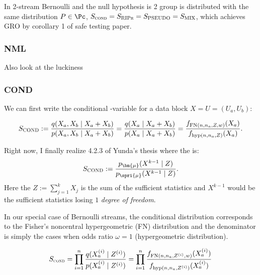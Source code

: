 \begin{remark}
	In 2-stream Bernoulli and the null hypothesis is 2 group is distributed with the same distribution $P \in \Pc$,
	$S_{\textsc{cond}} = S_{\textsc{RIPr}} = S_{\textsc{PSEUDO}} = S_{\textsc{MIX}}$,
	which achieves GRO by corollary 1 of safe testing paper.
\end{remark}

\subsubsection{NML}

Also look at the luckiness

\subsubsection{COND}


We can first write the conditional \E-variable for a data block $X = U = (U_a, U_b)$:

\begin{align*}
	S_{\textsc{COND}} := \frac{q(X_a, X_b \mid X_a + X_b)}{p(X_a, X_b \mid X_a + X_b)}
	= \frac{q(X_a\mid X_a +X_b)}{p(X_a\mid X_a+X_b)}
	= \frac{f_{\textrm{FN}(n,n_a,Z,w)}(X_a)}{f_{\textrm{hyp}(n,n_a,Z)}(X_a)}.
\end{align*}

\begin{remark}
	Right now, I finally realize 4.2.3 of Yunda's thesis where the \E is:
	\begin{align*}
		S_{\textsc{COND}} := \frac{p_{\bm{\mu}}(X^{k-1}\mid Z)}{p_{\spri{\mu}}(X^{k-1}\mid Z)}.
	\end{align*}
	Here the $Z:=\sum_{j=1}^k X_j$ is the sum of the sufficient statistics and
	$X^{k-1}$ would be the sufficient statistics losing $1$ \emph{degree of freedom}.
\end{remark}

In our special case of Bernoulli streams, the conditional distribution corresponds to
the Fisher's noncentral hypergeometric (FN) distribution and the denominator is
simply the cases when odds ratio $\omega = 1$ (hypergeometric distribution).

\begin{align*}
	S_{\textsc{\tiny COND}} = \prod_{i=1}^n \frac{q(X_a^{(i)}\mid Z^{(i)})}{p(X_a^{(i)}\mid Z^{(i)})}
	= \prod_{i=1}^n \frac{f_{\textrm{FN}(n,n_a,Z^{(i)},w)}(X_a^{(i)})}{f_{\textrm{hyp}(n,n_a,Z^{(i)})}(X_a^{(i)})}
\end{align*}

